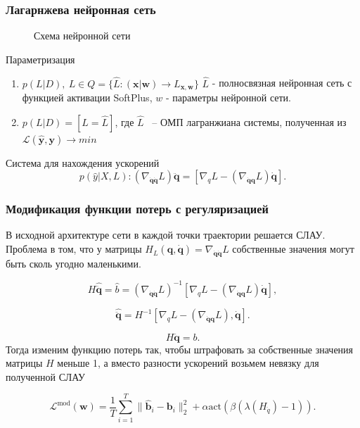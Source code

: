 \documentclass{beamer}
\begin{document}
\begin{frame}
\frametitle{Лагарнжева нейронная сеть}

\begin{figure}[H]
\centerline{
}
\caption{Схема нейронной сети}
\label{fig: LNN}
\end{figure}
\begin{block}{Параметризация}
\begin{enumerate}
\item$p(L|D),\ L \in Q = \{\hat{L} \colon (\mathbf{x} | \mathbf{w}) \to L_{\mathbf{x}, \mathbf{w}}\}$
$\hat{L}$ - полносвязная нейронная сеть с функцией активации SoftPlus, $w$ - параметры нейронной сети.
\item $p(L|D) = [L = \hat{L}]$, где $\hat{L}$ ~-- ОМП лагранжиана системы, полученная из $\mathcal{L}(\hat{\mathbf{y}}, \mathbf{y}) \to min$
\end{enumerate}
\end{block}

\begin{block}{Система для нахождения ускорений}
\[
p(\hat{y}| X, L): \left(\nabla_{\dot{\mathbf{q}} \dot{\mathbf{q}}} L\right)\ddot{\mathbf{q}} = \left[\nabla_{q} L-\left(\nabla_{\dot{\mathbf{q}}\mathbf{q}} L\right) \dot{\mathbf{q}}\right].
\]
\end{block}

\end{frame}



\begin{frame}
\frametitle{Модификация функции потерь с регуляризацией}
В исходной архитектуре сети в каждой точки траектории решается СЛАУ. Проблема в том, что у матрицы $H_L(\mathbf{q}, \dot{\mathbf{q}}) = \nabla_{\dot{\mathbf{q}} \dot{\mathbf{q}}} L$ собственные значения могут быть сколь угодно маленькими. 

 \[H\hat{\ddot{\mathbf{q}}} = \hat{b} = \left(\nabla_{\dot{\mathbf{q}} \dot{\mathbf{q}}} L\right)^{-1}\left[\nabla_{q} L-\left(\nabla_{\dot{\mathbf{q}}\mathbf{q}} L\right) \dot{\mathbf{q}}\right], \]

$$
\hat{\ddot{\mathbf{q}}} = H^{-1}\left[\nabla_{q} L-\left(\nabla_{\dot{\mathbf{q}}\mathbf{q}} L\right), \dot{\mathbf{q}}\right].
$$

$$
H\ddot{\mathbf{q}} = b.
$$
Тогда изменим функцию потерь так, чтобы штрафовать за собственные значения матрицы $H$  меньше 1, а вместо разности ускорений возьмем невязку для полученной СЛАУ

$$
 \mathcal{L}^{\text{mod}}(\textbf{w}) = \frac{1}{T}\sum_{i=1}^{T} \| \mathbf{\hat{b}}_i - \mathbf{b}_i \|_2^2  + \alpha \text{act}(\beta (\lambda(H_{\ddot{q}}) - 1)).
$$
\end{frame}
\end{document}
